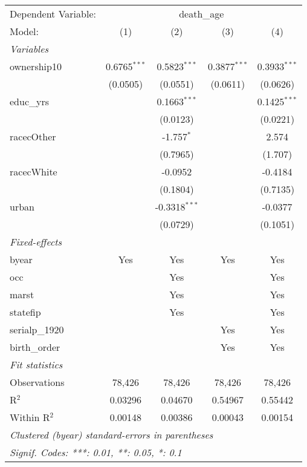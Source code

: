 
\begingroup
\centering
\begin{tabular}{lcccc}
   \tabularnewline \midrule \midrule
   Dependent Variable: & \multicolumn{4}{c}{death\_age}\\
   Model:         & (1)            & (2)             & (3)            & (4)\\  
   \midrule
   \emph{Variables}\\
   ownership10    & 0.6765$^{***}$ & 0.5823$^{***}$  & 0.3877$^{***}$ & 0.3933$^{***}$\\   
                  & (0.0505)       & (0.0551)        & (0.0611)       & (0.0626)\\   
   educ\_yrs      &                & 0.1663$^{***}$  &                & 0.1425$^{***}$\\   
                  &                & (0.0123)        &                & (0.0221)\\   
   racecOther     &                & -1.757$^{*}$    &                & 2.574\\   
                  &                & (0.7965)        &                & (1.707)\\   
   racecWhite     &                & -0.0952         &                & -0.4184\\   
                  &                & (0.1804)        &                & (0.7135)\\   
   urban          &                & -0.3318$^{***}$ &                & -0.0377\\   
                  &                & (0.0729)        &                & (0.1051)\\   
   \midrule
   \emph{Fixed-effects}\\
   byear          & Yes            & Yes             & Yes            & Yes\\  
   occ            &                & Yes             &                & Yes\\  
   marst          &                & Yes             &                & Yes\\  
   statefip       &                & Yes             &                & Yes\\  
   serialp\_1920  &                &                 & Yes            & Yes\\  
   birth\_order   &                &                 & Yes            & Yes\\  
   \midrule
   \emph{Fit statistics}\\
   Observations   & 78,426         & 78,426          & 78,426         & 78,426\\  
   R$^2$          & 0.03296        & 0.04670         & 0.54967        & 0.55442\\  
   Within R$^2$   & 0.00148        & 0.00386         & 0.00043        & 0.00154\\  
   \midrule \midrule
   \multicolumn{5}{l}{\emph{Clustered (byear) standard-errors in parentheses}}\\
   \multicolumn{5}{l}{\emph{Signif. Codes: ***: 0.01, **: 0.05, *: 0.1}}\\
\end{tabular}
\par\endgroup


